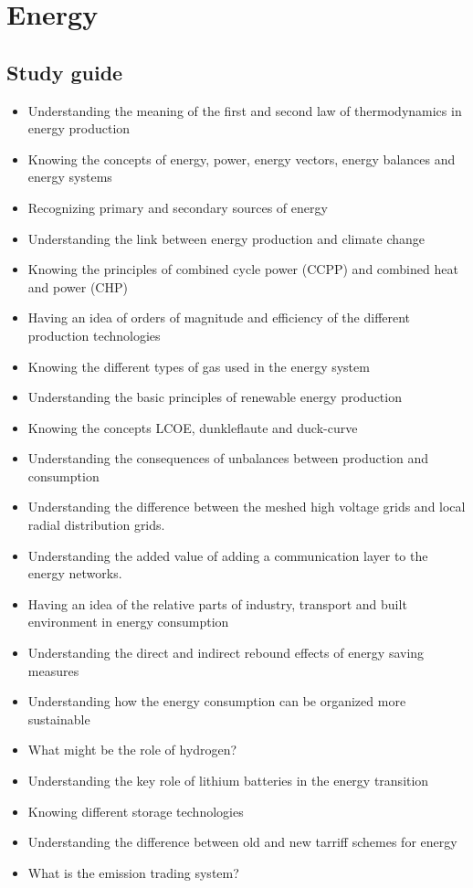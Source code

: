 \documentclass[../summary.tex]{subfiles}
\begin{document}
	
	\section{Energy}
	
	\subsection{Study guide}
	\begin{itemize} 
		\item Understanding the meaning of the first and second law of thermodynamics in energy production
		\item Knowing the concepts of energy, power, energy vectors, energy balances and energy systems

		\item Recognizing primary and secondary sources of energy
		\item Understanding the link between energy production and climate change
		\item Knowing the principles of combined cycle power (CCPP) and combined heat and power (CHP)
		\item Having an idea of orders of magnitude and efficiency of the different production technologies
		\item Knowing the different types of gas used in the energy system

		\item Understanding the basic principles of renewable energy production

		\item Knowing the concepts LCOE, dunkleflaute and duck-curve
		\item Understanding the consequences of unbalances between production and consumption

		\item Understanding the difference between the meshed high voltage grids and local radial distribution grids.
		\item Understanding the added value of adding a communication layer to the energy networks.

		\item Having an idea of the relative parts of industry, transport and built environment in energy
		consumption
		\item Understanding the direct and indirect rebound effects of energy saving measures

		\item Understanding how the energy consumption can be organized more sustainable
		\item What might be the role of hydrogen?

		\item Understanding the key role of lithium batteries in the energy transition
		\item Knowing different storage technologies

		\item Understanding the difference between old and new tarriff schemes for energy

		\item What is the emission trading system?
	\end{itemize}
	
\end{document}
